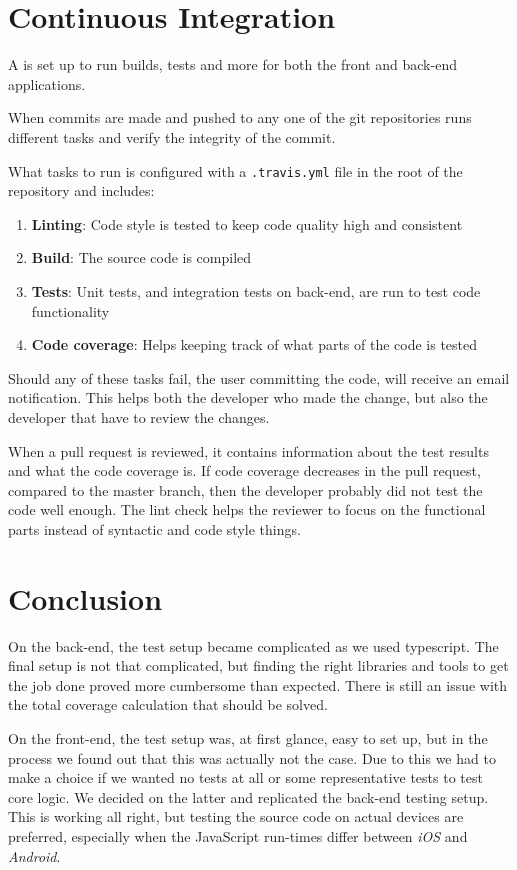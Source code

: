 \section{Continuous Integration}
A  is set up to run builds, tests and more for both the front and back-end applications.

When commits are made and pushed to any one of the git repositories  runs different tasks and verify the integrity of the commit.

What tasks to run is configured with a \verb+.travis.yml+ file in the root of the repository and includes:

\begin{enumerate}
\item \textbf{Linting}: Code style is tested to keep code quality high and consistent
\item \textbf{Build}: The source code is compiled
\item \textbf{Tests}: Unit tests, and integration tests on back-end, are run to test code functionality
\item \textbf{Code coverage}: Helps keeping track of what parts of the code is tested
\end{enumerate} 

Should any of these tasks fail, the user committing the code, will receive an email notification.
This helps both the developer who made the change, but also the developer that have to review the changes.

When a pull request is reviewed, it contains information about the test results and what the code coverage is.
If code coverage decreases in the pull request, compared to the master branch, then the developer probably did not test the code well enough. 
The lint check helps the reviewer to focus on the functional parts instead of syntactic and code style things.

\section{Conclusion}
On the back-end, the test setup became complicated as we used \gls{typescript}.
The final setup is not that complicated, but finding the right libraries and tools to get the job done proved more cumbersome than expected.
There is still an issue with the total coverage calculation that should be solved.

On the front-end, the test setup was, at first glance, easy to set up, but in the process we found out that this was actually not the case.
Due to this we had to make a choice if we wanted no tests at all or some representative tests to test core logic.
We decided on the latter and replicated the back-end testing setup.
This is working all right, but testing the source code on actual devices are preferred, especially when the JavaScript run-times differ between \textit{iOS} and \textit{Android}.

